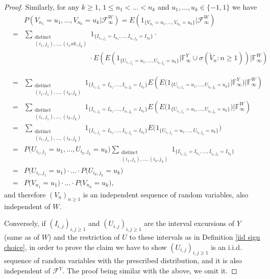 \documentclass[reqno]{amsart}
\theoremstyle{definition}
\theoremstyle{remark}
\numberwithin{equation}{section}
\begin{document}
\begin{proof}
Similarly, for any $k\ge 1$, $1\le n_1<\ldots <n_k$ and  $u_1,\ldots,u_k\in\{-1,1\}$ we have
\begin{eqnarray*}
&&P\left(V_{n_1}=u_1,\ldots,V_{n_k}=u_k\vert \mathcal{F}^W_\infty\right)=E\left( 1_{\{V_{n_1}=u_1,\ldots,V_{n_k}=u_k\}} \big\vert \mathcal{F}^W_\infty\right)\\
&=&\sum_{\substack{\text{distinct}\\(i_1,j_1),\ldots,(i_xxk,j_k)}} 1_{\{I_{i_1,j_1}=I_{n_1},\ldots, I_{i_k,j_k}=I_{n_k}\}}\cdot\\
&&\phantom{\sum_{\substack{\text{distinct}\\(i_1,j_1),\ldots,(i_k,j_k)}}x}\cdot E\left(E\left(1_{\{U_{i_1,j_1}=u_1,\ldots,U_{i_k,j_k}=u_k\}} \big\vert \mathbb{F}^Y_\infty \cup \sigma(\widetilde{V}_n:n\ge 1)\right) \Big\vert\mathbb{F}^W_\infty\right)\\
&=&\sum_{\substack{\text{distinct}\\(i_1,j_1),\ldots,(i_k,j_k)}} 1_{\{I_{i_1,j_1}=I_{n_1},\ldots, I_{i_k,j_k}=I_{n_k}\}} E\left(E\big(1_{\{U_{i_1,j_1}=u_1,\ldots,U_{i_k,j_k}=u_k\}} \big\vert \mathbb{F}^Y_\infty\big) \Big\vert\mathbb{F}^W_\infty\right)\\
&=&\sum_{\substack{\text{distinct}\\(i_1,j_1),\ldots,(i_k,j_k)}} 1_{\{I_{i_1,j_1}=I_{n_1},\ldots, I_{i_k,j_k}=I_{n_k}\}} E\left(E\big(1_{\{U_{i_1,j_1}=u_1,\ldots,U_{i_k,j_k}=u_k\}} \big) \Big\vert\mathbb{F}^W_\infty\right)\\
&=&\sum_{\substack{\text{distinct}\\(i_1,j_1),\ldots,(i_k,j_k)}} 1_{\{I_{i_1,j_1}=I_{n_1},\ldots, I_{i_k,j_k}=I_{n_k}\}} E\big(1_{\{U_{i_1,j_1}=u_1,\ldots,U_{i_k,j_k}=u_k\}} \big)\\
&=&P\big(U_{i_1,j_1}=u_1,\ldots,U_{i_k,j_k}=u_k \big) \sum_{\substack{\text{distinct}\\(i_1,j_1),\ldots,(i_k,j_k)}} 1_{\{I_{i_1,j_1}=I_{n_1},\ldots, I_{i_k,j_k}=I_{n_k}\}} \\
&=&P\big(U_{i_1,j_1}=u_1\big)\cdot\ldots\cdot P\big(U_{i_k,j_k}=u_k \big)\\
&=&P\big(V_{n_1}=u_1\big)\cdot\ldots\cdot P\big(V_{n_k}=u_k \big),
\end{eqnarray*}
and therefore $(V_n)_{n\ge1}$ is an independent sequence of random variables, also independent of $W$.

Conversely, if $(I_{i,j})_{i,j\ge1}$ and $(U_{i,j})_{i,j\ge 1}$ are the interval excursions of $Y$ (same as of $W$) and the restriction of $U$ to these intervals as in Definition \ref{iid sign choice}, in order to prove the claim we have to show $(U_{i,j})_{i,j\ge 1}$ is an i.i.d. sequence of random variables with the prescribed distribution, and it is also independent of $\mathcal{F}^Y$. The proof being similar with the above, we omit it.
\end{proof}
\end{document}
